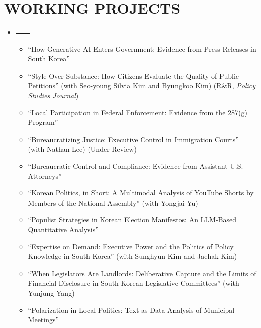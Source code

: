 \documentclass[a4paper,11pt]{article}
\makeatletter
\newcommand{\resumeItem}[1]{
  \item\small{
    {#1 \vspace{-2pt}}
  }
}
\newcommand{\resumeProjectHeading}[2]{
    \item
    \begin{tabular*}{1.001\textwidth}{l@{\extracolsep{\fill}}r}
      \small#1 & \textbf{\small #2}\\
    \end{tabular*}\vspace{-7pt}
}
\newcommand{\resumeSubItem}[1]{%
  \item[]\hspace{\labelwidth}\hspace{-\labelsep}%
  {-} \hspace{1pt}%
  \small{#1}%
}
\newcommand{\resumeSubHeadingListStart}{\begin{itemize}[leftmargin=0.0in, label={}]}
\newcommand{\resumeSubHeadingListEnd}{\end{itemize}}
\newcommand{\resumeItemListStart}{\begin{itemize}}
\newcommand{\resumeItemListEnd}{\end{itemize}\vspace{-5pt}}
\makeatother
\begin{document}
\section{WORKING PROJECTS}
    \vspace{-4pt}
    \resumeSubHeadingListStart
     \resumeProjectHeading
          {}{}
          \vspace{-25pt}
          \resumeItemListStart
            \resumeItem{``How Generative AI Enters Government: Evidence from Press Releases in South Korea''}\\[0.7em]
            \resumeItem{``Style Over Substance: How Citizens Evaluate the Quality of Public Petitions'' (with Seo-young Silvia Kim and Byungkoo Kim) (R\&R, \emph{Policy Studies Journal})}\\[0.7em]
            \resumeItem{``Local Participation in Federal Enforcement: Evidence from the 287(g) Program''}\\[0.7em]
            \resumeItem{``Bureaucratizing Justice: Executive Control in Immigration Courts'' (with Nathan Lee) (Under Review)}\\[0.7em]
            \resumeItem{``Bureaucratic Control and Compliance: Evidence from Assistant U.S. Attorneys''}\\[0.7em]
            \resumeItem{``Korean Politics, in Short: A Multimodal Analysis of YouTube Shorts by Members of the National Assembly'' (with Yongjai Yu)}\\[0.7em]
            \resumeItem{``Populist Strategies in Korean Election Manifestos: An LLM-Based Quantitative Analysis''}\\[0.7em]
            \resumeItem{``Expertise on Demand: Executive Power and the Politics of Policy Knowledge in South Korea'' (with Sunghyun Kim and Jaehak Kim)}\\[0.7em]
            \resumeItem{``When Legislators Are Landlords: Deliberative Capture and the Limits of Financial Disclosure in South Korean Legislative Committees'' (with Yunjung Yang)}\\[0.7em]
            \resumeItem{``Polarization in Local Politics: Text-as-Data Analysis of Municipal Meetings''}
          \resumeItemListEnd
    \resumeSubHeadingListEnd
\vspace{0pt}
\end{document}
